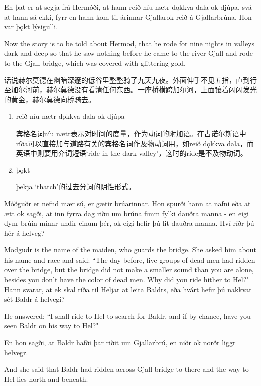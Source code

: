 \medskip
\begin{paracol}{2}
  En þat er at segja frá Hermóði, at hann reið níu nætr dǫkkva dala ok djúpa, svá at hann sá ekki, fyrr en hann kom til árinnar Gjallar\footnotemark ok reið á Gjallarbrúna. Hon var þǫkt lýsigulli.

  \switchcolumn

  Now the story is to be told about Hermod, that he rode for nine nights in valleys dark and deep so that he saw nothing before he came to the river Gjall and rode to the Gjall-bridge, which was covered with glittering gold.
\end{paracol}
\begin{translation*}{}
  话说赫尔莫德在幽暗深邃的低谷里整整骑了九天九夜。外面伸手不见五指，直到行至加尔河前，赫尔莫德没有看清任何东西。一座桥横跨加尔河，上面镶着闪闪发光的黄金，赫尔莫德向桥骑去。
\end{translation*}
\begin{grammar*}{}
  \begin{enumerate}[leftmargin=*]
    \item reið níu nætr dǫkkva dala ok djúpa

          宾格名词níu nætr表示对时间的度量，作为动词的附加语。在古诺尔斯语中ríða可以直接加与道路有关的宾格名词作及物动词用，如reið dǫkkva dala，而英语中则要用介词短语`ride in the dark valley'，这时的ride是不及物动词。

    \item þǫkt

          þekja `thatch'的过去分词的阴性形式。
  \end{enumerate}
\end{grammar*}
\begin{paracol}{2}
  Móðguðr er nefnd mær sú, er gætir brúarinnar. Hon spurði hann at nafni eða at ætt ok sagði, at inn fyrra dag riðu um brúna fimm fylki dauðra manna - en eigi dynr brúin minnr undir einum þér, ok eigi hefir þú lit dauðra manna. Hví ríðr þú hér á helveg?
  \switchcolumn

  Modgudr is the name of the maiden, who guards the bridge. She asked him about his name and race and said: ``The day before, five groups of dead men had ridden over the bridge, but the bridge did not make a smaller sound than you are alone, besides you don't have the color of dead men. Why did you ride hither to Hel?"
  \switchcolumn*
  Hann svarar, at ek skal ríða til Heljar at leita Baldrs, eða hvárt hefir þú nakkvat sét Baldr á helvegi?

  \switchcolumn

  He answered: ``I shall ride to Hel to search for Baldr, and if by chance, have you seen Baldr on his way to Hel?"

  \switchcolumn*
  En hon sagði, at Baldr hafði þar riðit um Gjallarbrú, en niðr ok norðr liggr helvegr.

  \switchcolumn
  And she said that Baldr had ridden across Gjall-bridge to there and the way to Hel lies north and beneath.
\end{paracol}

